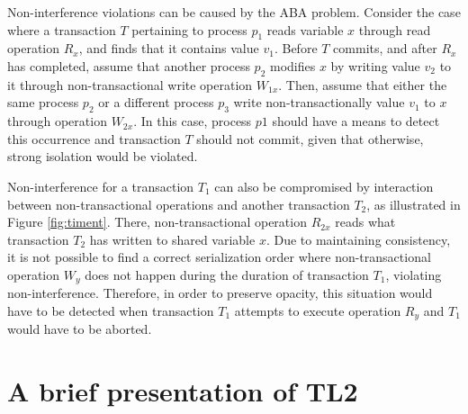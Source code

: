 \documentclass[11pt,letterpaper]{article}
\newcommand{\Xomit}[1]{}
\begin{document}
Non-interference violations can be caused  by the ABA problem. Consider the
case where a transaction $T$  
pertaining  to process  $p_1$  reads variable  $x$  through read  operation
$R_x$, and finds that it contains value  
$v_1$.  Before $T$  commits, and  after  $R_x$ has  completed, assume  that
another process $p_2$ modifies $x$  
by  writing value  $v_2$ to  it through  non-transactional  write operation
$W_{1x}$. Then, assume that either the  
same process  $p_2$ or a different process  $p_3$ write non-transactionally
value $v_1$ to $x$ through operation  
$W_{2x}$. In  this case, process  $p1$ should have  a means to  detect this
occurrence and transaction $T$ should  
not commit, given that otherwise, strong isolation would be violated. 


Non-interference for  a transaction  $T_1$ can also  be compromised  by 
interaction between non-transactional  
operations  and  another  transaction   $T_2$,  as  illustrated  in  Figure
\ref{fig:timent}. There, non-transactional operation  
$R_{2x}$  reads  what transaction  $T_2$  has  written  to shared  variable
$x$. Due to maintaining consistency, it is not  
possible  to find  a  correct serialization  order where  non-transactional
operation $W_y$ does not happen during the  
duration  of transaction $T_1$,  violating non-interference.  Therefore, in
order to preserve opacity, this situation would  
have to  be detected when  transaction $T_1$ attempts to  execute operation
$R_y$ and $T_1$ would have to be aborted. 
 

\begin{figure*}[h]
\centerline{
}
\caption{Transaction  $T_2$  and  non-transactional operations  of  process
$p_3$ interfere with transaction $T_1$.} 
\label{fig:timent}
\end{figure*}


\Xomit{%
Many  TM algorithms,  and  so  also TL2,  already  trivially satisfy  strong
isolation and the characteristics that we consider that it implies,  
provided   that    shared   memory   is    exclusively   accessed   through
transactions. When shared memory is accessed through non-transactional  
operations also, the TM algorithm that is used has to be extended so that it
prevents the scenarios discussed above.  
} %


\section{A brief presentation of TL2}
\label{sec:tl2}
\end{document}

